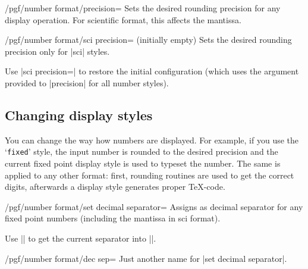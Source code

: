 \begin{key}{/pgf/number format/precision=}
  Sets the desired rounding precision for any display operation. For
  scientific format, this affects the mantissa. 
\end{key}

\begin{key}{/pgf/number format/sci precision= (initially empty)}
  Sets the desired rounding precision only for |sci| styles.

  Use |sci precision={}| to restore the initial configuration (which
  uses the argument provided to |precision| for all number styles). 
\end{key}

\subsection{Changing display styles}%
\label{sec:number:styles}%

You can change the way how numbers are displayed. For example, if you
use the `\texttt{fixed}' style, the input number is rounded to the
desired precision and the current fixed point display style is used to
typeset the number. The same is applied to any other format: first,
rounding routines are used to get the correct digits, afterwards a
display style generates proper \TeX-code. 

\begin{key}{/pgf/number format/set decimal separator=}
  Assigns  as decimal separator for any fixed point numbers
  (including the mantissa in sci format). 

  Use |\value| 
  to get the current separator into |\value|. 
\end{key}

\begin{stylekey}{/pgf/number format/dec sep=}
  Just another name for |set decimal separator|.
\end{stylekey}

